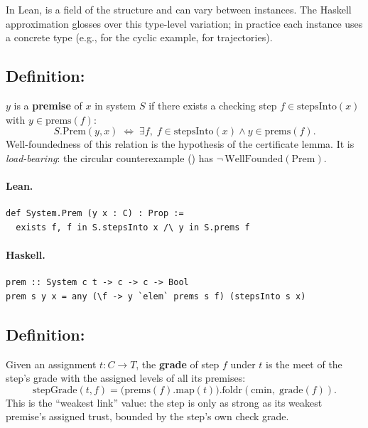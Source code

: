 \documentclass[11pt,a4paper]{article}
\begin{document}
\begin{fidelitynote}
In Lean,  is a field of the structure and can vary between
instances.  The Haskell approximation glosses over this type-level variation;
in practice each instance uses a concrete  type (e.g., 
for the cyclic example,  for trajectories).
\end{fidelitynote}


\subsection{Definition: }

\begin{defn}
$y$ is a \textbf{premise} of $x$ in system $S$ if there exists a checking
step $f \in \mathrm{stepsInto}(x)$ with $y \in \mathrm{prems}(f)$:
\[
  S.\mathrm{Prem}(y, x) \;\iff\;
  \exists f,\; f \in \mathrm{stepsInto}(x) \wedge y \in \mathrm{prems}(f).
\]
Well-foundedness of this relation is the hypothesis of the certificate lemma.
It is \emph{load-bearing}: the circular counterexample () has
$\neg\,\mathrm{WellFounded}(\mathrm{Prem})$.
\end{defn}

\paragraph{Lean.}
\begin{lstlisting}[style=lean]
def System.Prem (y x : C) : Prop :=
  exists f, f in S.stepsInto x /\ y in S.prems f
\end{lstlisting}

\paragraph{Haskell.}
\begin{lstlisting}[style=haskell]
prem :: System c t -> c -> c -> Bool
prem s y x = any (\f -> y `elem` prems s f) (stepsInto s x)
\end{lstlisting}


\subsection{Definition: }

\begin{defn}
Given an assignment $t : C \to T$, the \textbf{grade} of step $f$ under $t$
is the meet of the step's grade with the assigned levels of all its premises:
\[
  \mathrm{stepGrade}(t, f) =
  \bigl(\mathrm{prems}(f).\mathrm{map}(t)\bigr).\mathrm{foldr}(\mathrm{cmin},\;
  \mathrm{grade}(f)).
\]
This is the ``weakest link'' value: the step is only as strong as its weakest
premise's assigned trust, bounded by the step's own check grade.
\end{defn}
\end{document}
